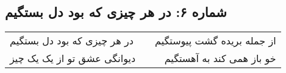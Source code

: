 \begin{center}
\section*{شماره ۶: در هر چیزی که بود دل بستگیم}
\label{sec:006}
\begin{longtable}{l p{0.5cm} r}
در هر چیزی که بود دل بستگیم
&&
از جمله بریده گشت پیوستگیم
\\
دیوانگی عشق تو از یک یک چیز
&&
خو باز همی کند به آهستگیم
\\
\end{longtable}
\end{center}
